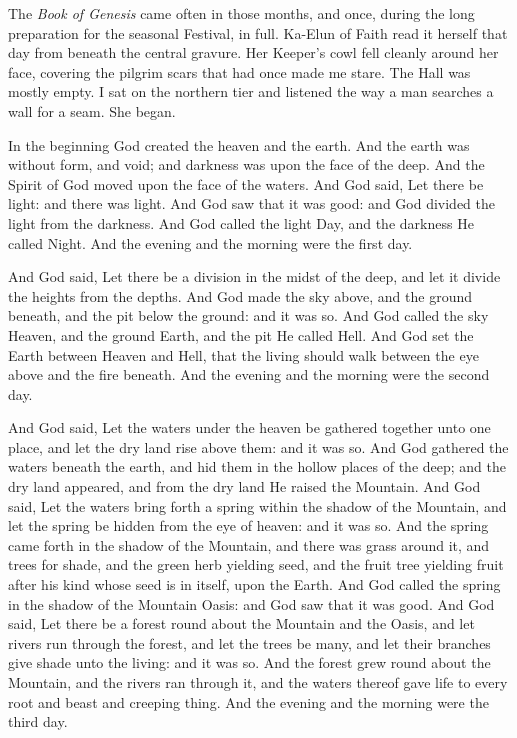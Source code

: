 The \textit{Book of Genesis} came often in those months, and once, during the long preparation for the seasonal Festival, in full. Ka-Elun of Faith read it herself that day from beneath the central gravure. Her Keeper's cowl fell cleanly around her face, covering the pilgrim scars that had once made me stare. The Hall was mostly empty. I sat on the northern tier and listened the way a man searches a wall for a seam. She began.\par

\begin{scripture}
In the beginning God created the heaven and the earth. And the earth was without form, and void; and darkness was upon the face of the deep. 
And the Spirit of God moved upon the face of the waters. And God said, Let there be light: and there was light. 
And God saw that it was good: and God divided the light from the darkness. 
And God called the light Day, and the darkness He called Night. And the evening and the morning were the first day.
\end{scripture}

\begin{scripture}
And God said, Let there be a division in the midst of the deep, and let it divide the heights from the depths. 
And God made the sky above, and the ground beneath, and the pit below the ground: and it was so. 
And God called the sky Heaven, and the ground Earth, and the pit He called Hell. 
And God set the Earth between Heaven and Hell, that the living should walk between the eye above and the fire beneath. 
And the evening and the morning were the second day.
\end{scripture}

\begin{scripture}
And God said, Let the waters under the heaven be gathered together unto one place, and let the dry land rise above them: and it was so. 
And God gathered the waters beneath the earth, and hid them in the hollow places of the deep; and the dry land appeared, and from the dry land He raised the Mountain. And God said, Let the waters bring forth a spring within the shadow of the Mountain, and let the spring be hidden from the eye of heaven: and it was so. 
And the spring came forth in the shadow of the Mountain, and there was grass around it, and trees for shade, and the green herb yielding seed, and the fruit tree yielding fruit after his kind whose seed is in itself, upon the Earth.
And God called the spring in the shadow of the Mountain Oasis: and God saw that it was good. 
And God said, Let there be a forest round about the Mountain and the Oasis, and let rivers run through the forest, and let the trees be many, and let their branches give shade unto the living: and it was so. 
And the forest grew round about the Mountain, and the rivers ran through it, and the waters thereof gave life to every root and beast and creeping thing. 
And the evening and the morning were the third day.
\end{scripture}

